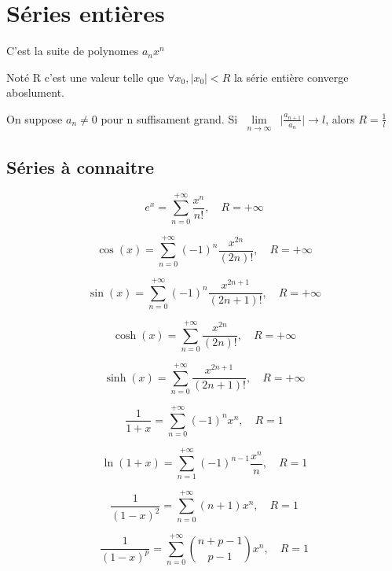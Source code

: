 \documentclass[french]{yLectureNote}
\newcommand{\Lim}[1]{\lim\limits_{\substack{#1}}\:}
\begin{document}
\section{Séries entières}
\begin{definition}
C'est la suite de polynomes \(a_nx^n\)
\end{definition}
\begin{definition}
Noté R c'est une valeur telle que \(\forall x_0, |x_0|<R\) la série entière converge aboslument.
\end{definition}
\begin{theorem}
 On suppose \(a_n\neq 0\) pour n suffisament grand. Si \(\Lim{n\to\infty}\big|\frac{a_{n+1}}{a_n}\big|\to l\), alors \(R=\frac{1}{l}\)
\end{theorem}
\subsection{Séries à connaitre}
\begin{theorem}[DL de l'exponentielle]
 \[e^x = \sum_{n=0}^{+\infty} \frac{x^n}{n!}, \quad R = +\infty\]
\end{theorem}
\begin{theorem}[DL de cosinus]
 \[\cos(x) = \sum_{n=0}^{+\infty} (-1)^n \frac{x^{2n}}{(2n)!}, \quad R = +\infty\]
\end{theorem}
\begin{theorem}[DL de sinus]
 \[\sin(x) = \sum_{n=0}^{+\infty} (-1)^n \frac{x^{2n+1}}{(2n+1)!}, \quad R = +\infty\]
\end{theorem}
\begin{theorem}
 \[\cosh(x) = \sum_{n=0}^{+\infty} \frac{x^{2n}}{(2n)!}, \quad R = +\infty\]
\end{theorem}
\begin{theorem}
 \[\sinh(x) = \sum_{n=0}^{+\infty} \frac{x^{2n+1}}{(2n+1)!}, \quad R = +\infty\]
\end{theorem}
\begin{theorem}
 \[\frac{1}{1+x} = \sum_{n=0}^{+\infty} (-1)^n x^n, \quad R = 1\]
\end{theorem}
\begin{theorem}[DL de ln]
 \[\ln(1+x) = \sum_{n=1}^{+\infty} (-1)^{n-1} \frac{x^n}{n}, \quad R = 1\]
\end{theorem}
\begin{theorem}
 \[\frac{1}{(1-x)^2} = \sum_{n=0}^{+\infty} (n+1)x^n, \quad R = 1\]
\end{theorem}
\begin{theorem}
 \[\frac{1}{(1-x)^p} = \sum_{n=0}^{+\infty} \binom{n+p-1}{p-1} x^n, \quad R = 1\]
\end{theorem}
\end{document}
